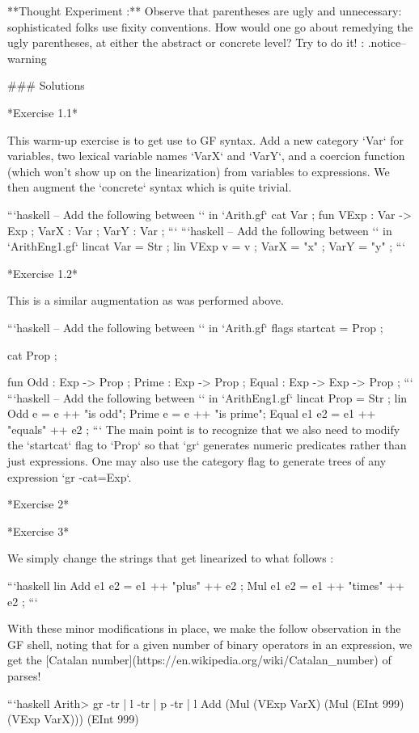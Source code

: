 \documentclass[11pt, a4paper]{article}
\begin{document}
**Thought Experiment :** Observe that parentheses are ugly and unnecessary:
sophisticated folks use fixity conventions. How would one go about remedying the
ugly parentheses, at either the abstract or concrete level? Try to do it! {:
.notice--warning}

### Solutions

*Exercise 1.1*

This warm-up exercise is to get use to GF syntax. Add a new category `Var` for
variables, two lexical variable names `VarX` and `VarY`, and a coercion function
(which won't show up on the linearization) from variables to expressions. We
then augment the `concrete` syntax which is quite trivial.

```haskell -- Add the following between `{}` in `Arith.gf` cat Var ; fun VExp :
Var -> Exp ; VarX : Var ; VarY : Var ; ``` ```haskell -- Add the following
between `{}` in `ArithEng1.gf` lincat Var = Str ; lin VExp v = v ; VarX = "x" ;
VarY = "y" ; ```

*Exercise 1.2*

This is a similar augmentation as was performed above.

```haskell -- Add the following between `{}` in `Arith.gf` flags startcat = Prop
;

cat Prop ;

fun Odd : Exp -> Prop ; Prime : Exp -> Prop ; Equal : Exp -> Exp -> Prop ; ```
```haskell -- Add the following between `{}` in `ArithEng1.gf` lincat Prop = Str
; lin Odd e = e ++ "is odd"; Prime e = e ++ "is prime"; Equal e1 e2 = e1 ++
"equals" ++ e2 ; ``` The main point is to recognize that we also need to modify
the `startcat` flag to `Prop` so that `gr` generates numeric predicates rather
than just expressions. One may also use the category flag to generate trees of
any expression `gr -cat=Exp`.

*Exercise 2*

*Exercise 3*

We simply change the strings that get linearized to what follows :

```haskell lin Add e1 e2 = e1 ++ "plus" ++ e2 ; Mul e1 e2 = e1 ++ "times" ++ e2
; ```

With these minor modifications in place, we make the follow observation in the
GF shell, noting that for a given number of binary operators in an expression,
we get the [Catalan number](https://en.wikipedia.org/wiki/Catalan_number) of
parses!

```haskell Arith> gr -tr | l -tr | p -tr | l Add (Mul (VExp VarX) (Mul (EInt
999) (VExp VarX))) (EInt 999)
\end{document}
